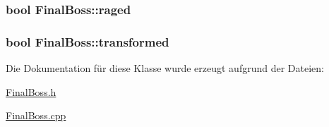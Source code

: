 \hypertarget{class_final_boss_ae03958c8fd33c1e01be3391e4dd7dc1b}{
\subsubsection[{raged}]{\setlength{\rightskip}{0pt plus 5cm}bool Final\-Boss\-::raged\hspace{0.3cm}{\ttfamily [private]}}}\label{class_final_boss_ae03958c8fd33c1e01be3391e4dd7dc1b}
\hypertarget{class_final_boss_af35eab748c9638f361848b2ab2e05f4e}{
\subsubsection[{transformed}]{\setlength{\rightskip}{0pt plus 5cm}bool Final\-Boss\-::transformed\hspace{0.3cm}{\ttfamily [private]}}}\label{class_final_boss_af35eab748c9638f361848b2ab2e05f4e}


Die Dokumentation für diese Klasse wurde erzeugt aufgrund der Dateien\-:\begin{DoxyCompactItemize}
\item 
\hyperlink{_final_boss_8h}{Final\-Boss.\-h}\item 
\hyperlink{_final_boss_8cpp}{Final\-Boss.\-cpp}\end{DoxyCompactItemize}
